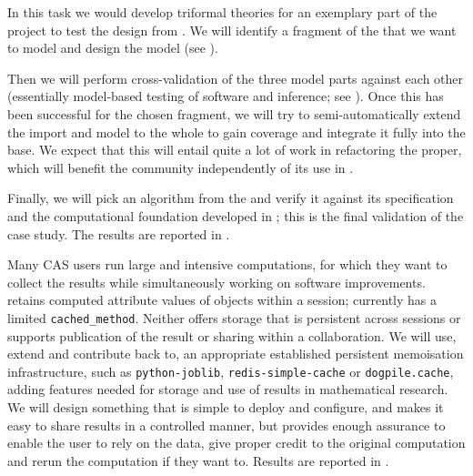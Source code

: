 \begin{workpackage}[id=dksbases,%
  title=Data/Knowledge/Software-Bases,lead=FAU,
  ZHRM=12,JURM=12,FAURM=34,UWRM=25,SARM=10,LLRM=2,PSRM=25]
\begin{tasklist}
\begin{task}[title=\LMFDB Case Study (Triformal Theories),id=data-LMFDB,
  lead=JU,partners={ZH,UW},PM=24,wphases={12-24!.25,24-48!.7},issue=130]
  In this task we would develop triformal theories for an exemplary part of the \LMFDB
  project to test the design from .  We will identify a
  fragment of the \LMFDB that we want to model and design the model (see
  ). 

  Then we will perform cross-validation of the three model parts against each other
  (essentially model-based testing of software and inference; see
  ). Once this has been successful for the chosen fragment, we
  will try to semi-automatically extend the import and model to the whole \LMFDB to gain
  coverage and integrate it fully into the \DKS base. We expect that this will entail
  quite a lot of work in refactoring the \LMFDB proper, which will benefit the \LMFDB
  community independently of its use in \TheProject.

  Finally, we will pick an algorithm from the \LMFDB and verify it against its
  specification and the computational foundation developed in
  ; this is the final validation of the case study. The
  results are reported in .
  \end{task}

\begin{task}[title=Memoisation and production of new data,id=data-memo,
  lead=SA,partners={US,PS,UW},PM=12,wphases=24-42!.6,issue=131]
  Many CAS users run large and intensive computations, for which they want to collect the
  results while simultaneously working on software improvements. \GAP retains computed
  attribute values of objects within a session; \Sage currently has a limited
  \texttt{cached\_method}. Neither offers storage that is persistent across sessions or
  supports publication of the result or sharing within a collaboration. We will use,
  extend and contribute back to, an appropriate established persistent memoisation
  infrastructure, such as \texttt{python-joblib}, \texttt{redis-simple-cache} or
  \texttt{dogpile.cache}, adding features needed for storage and use of results in
  mathematical research. We will design something that is simple to deploy and configure,
  and makes it easy to share results in a controlled manner, but provides enough assurance
  to enable the user to rely on the data, give proper credit to the original computation
  and rerun the computation if they want to. Results are reported in .


\end{task}
\end{tasklist}
\end{workpackage}
